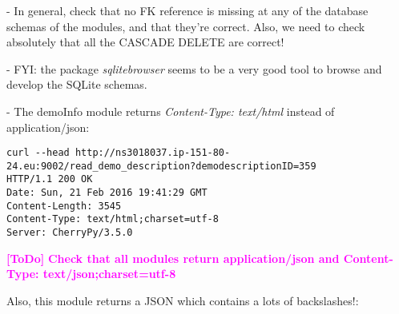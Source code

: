 \documentclass[a4paper,12pt]{article}
\newcommand{\ToDo}[1]{\textcolor{magenta}{\textbf{[ToDo]} \textbf{#1}}}
\begin{document}
- In general, check that no FK reference is missing at any of the database schemas of the modules, and that they're correct.
Also, we need to check absolutely that all the CASCADE DELETE are correct!

- FYI: the package \emph{sqlitebrowser} seems to be a very good tool to browse and develop the SQLite schemas.

- The demoInfo module returns \emph{Content-Type: text/html} instead of application/json:

\begin{verbatim}
curl --head http://ns3018037.ip-151-80-24.eu:9002/read_demo_description?demodescriptionID=359
HTTP/1.1 200 OK
Date: Sun, 21 Feb 2016 19:41:29 GMT
Content-Length: 3545
Content-Type: text/html;charset=utf-8
Server: CherryPy/3.5.0
\end{verbatim}
\ToDo{Check that all modules return application/json and Content-Type: text/json;charset=utf-8}

Also, this module returns a JSON which contains a lots of backslashes!:
\end{document}
